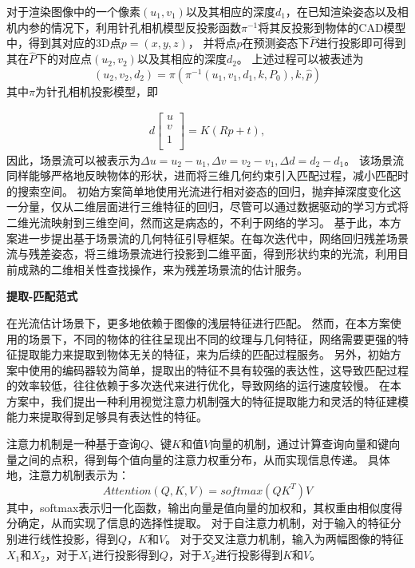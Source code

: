 \documentclass[12pt]{article}
\begin{document}
对于渲染图像中的一个像素$(u_1,v_1)$以及其相应的深度$d_1$，在已知渲染姿态以及相机内参的情况下，利用针孔相机模型反投影函数$\pi^{-1}$将其反投影到物体的CAD模型中，得到其对应的3D点$p=(x,y,z)$，
并将点$p$在预测姿态下$\hat{P}$进行投影即可得到其在$\hat{P}$下的对应点$(u_2,v_2)$以及其相应的深度$d_2$。
上述过程可以被表述为
\begin{equation}
    (u_2,v_2,d_2) = \pi(\pi^{-1}(u_1, v_1,d_1, k,P_0), k, \hat{p})
\end{equation}
其中$\pi$为针孔相机投影模型，即

\begin{equation}
    \begin{aligned}
    d
    \begin{bmatrix}
    u \\
    v \\
    1 \\
    \end{bmatrix}
    =K(Rp+t),
    \end{aligned}
\end{equation}
因此，场景流可以被表示为$\Delta u = u_2 - u_1, \Delta v = v_2 - v_1, \Delta d = d_2 - d_1$。
该场景流同样能够严格地反映物体的形状，进而将三维几何约束引入匹配过程，减小匹配时的搜索空间。
初始方案简单地使用光流进行相对姿态的回归，抛弃掉深度变化这一分量，仅从二维层面进行三维特征的回归，尽管可以通过数据驱动的学习方式将二维光流映射到三维空间，然而这是病态的，不利于网络的学习。
基于此，本方案进一步提出基于场景流的几何特征引导框架。在每次迭代中，网络回归残差场景流与残差姿态，将三维场景流进行投影到二维平面，得到形状约束的光流，利用目前成熟的二维相关性查找操作，来为残差场景流的估计服务。






\textbf{提取-匹配范式}

在光流估计场景下，更多地依赖于图像的浅层特征进行匹配。
然而，在本方案使用的场景下，不同的物体的往往呈现出不同的纹理与几何特征，网络需要更强的特征提取能力来提取到物体无关的特征，来为后续的匹配过程服务。
另外，初始方案中使用的编码器较为简单，提取出的特征不具有较强的表达性，这导致匹配过程的效率较低，往往依赖于多次迭代来进行优化，导致网络的运行速度较慢。
在本方案中，我们提出一种利用视觉注意力机制强大的特征提取能力和灵活的特征建模能力来提取得到足够具有表达性的特征。


注意力机制是一种基于查询$Q$、键$K$和值$V$向量的机制，通过计算查询向量和键向量之间的点积，得到每个值向量的注意力权重分布，从而实现信息传递。
具体地，注意力机制表示为：
\begin{equation}
    Attention(Q, K, V) = softmax(QK^T)V
\end{equation}
其中，softmax表示归一化函数，输出向量是值向量的加权和，其权重由相似度得分确定，从而实现了信息的选择性提取。
对于自注意力机制，对于输入的特征分别进行线性投影，得到$Q$，$K$和$V$。
对于交叉注意力机制，输入为两幅图像的特征$X_1$和$X_2$，对于$X_1$进行投影得到$Q$，对于$X_2$进行投影得到$K$和$V$。
\end{document}
